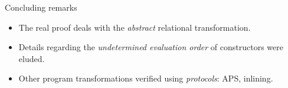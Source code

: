 \begin{frame}{Concluding remarks}
\Large
\begin{itemize}
    \setlength\itemsep{1.5em}
    \item The real proof deals with the \emph{abstract} relational transformation.
    \item Details regarding the \emph{undetermined evaluation order} of constructors were eluded.
    \item Other program transformations verified using \emph{protocols}: APS, inlining.
\end{itemize}
\end{frame}